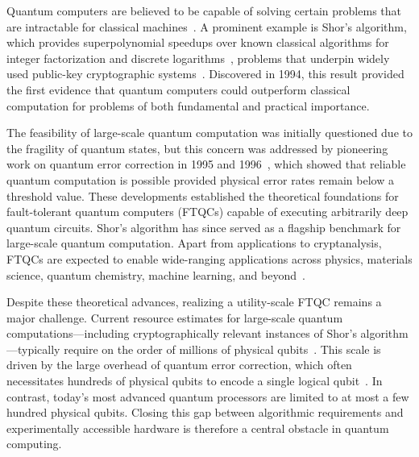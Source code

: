 \documentclass[reprint,twocolumn,secnumarabic,amssymb, aps, prx]{revtex4-2}
\begin{document}
\maketitle

Quantum computers are believed to be capable of solving certain problems that are intractable for classical machines~\cite{deutsch1992rapid,simon1997power}. A prominent example is Shor’s algorithm, which provides superpolynomial speedups over known classical algorithms for integer factorization and discrete logarithms~\cite{shor1994algorithms,kitaev1995quantum}, problems that underpin widely used public-key cryptographic systems~\cite{rivest1978method, koblitz1987elliptic}. Discovered in 1994, this result provided the first evidence that quantum computers could outperform classical computation for problems of both fundamental and practical importance. 

The feasibility of large-scale quantum computation was initially questioned due to the fragility of quantum states, but this concern was addressed by pioneering work on quantum error correction in 1995 and 1996~\cite{shor1995scheme,calderbank1996good,shor1996fault,steane1996error,steane1996simple,gottesman1998theory,kitaev2003fault}, which showed that reliable quantum computation is possible provided physical error rates remain below a threshold value. These developments established the theoretical foundations for fault-tolerant quantum computers (FTQCs) capable of executing arbitrarily deep quantum circuits. Shor’s algorithm has since served as a flagship benchmark for large-scale quantum computation. Apart from applications to cryptanalysis, FTQCs are expected to enable wide-ranging applications across physics, materials science, quantum chemistry, machine learning, and beyond~\cite{dalzell2023quantum,huang2025vast,babbush2025grand,eisert2025mind}.

Despite these theoretical advances, realizing a utility-scale FTQC remains a major challenge. Current resource estimates for large-scale quantum computations---including cryptographically relevant instances of Shor’s algorithm---typically require on the order of millions of physical qubits~\cite{gidney2025how}. This scale is driven by the large overhead of quantum error correction, which often necessitates hundreds of physical qubits to encode a single logical qubit~\cite{fowler2012surface}. In contrast, today’s most advanced quantum processors are limited to at most a few hundred physical qubits. Closing this gap between algorithmic requirements and experimentally accessible hardware is therefore a central obstacle in quantum computing.
\end{document}
